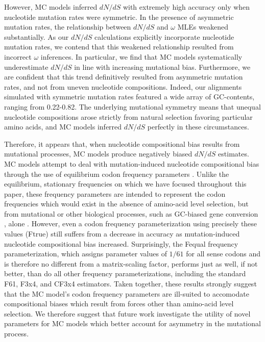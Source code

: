 \documentclass{pnastwo}
\begin{document}
\begin{article}
However, MC models inferred $dN/dS$ with extremely high accuracy only when nucleotide mutation rates were symmetric. In the presence of asymmetric mutation rates, the relationship between $dN/dS$ and $\omega$ MLEs weakened substantially. As our $dN/dS$ calculations explicitly incorporate nucleotide mutation rates, we contend that this weakened relationship resulted from incorrect $\omega$ inferences. In particular, we find that MC models systematically underestimate $dN/dS$ in line with increasing mutational bias. Furthermore, we are confident that this trend definitively resulted from asymmetric mutation rates, and not from uneven nucleotide compositions. Indeed, our alignments simulated with symmetric mutation rates featured a wide array of GC-contents, ranging from 0.22-0.82. The underlying mutational symmetry means that unequal nucleotide compositions arose strictly from natural selection favoring particular amino acids, and MC models inferred $dN/dS$ perfectly in these circumstances.
		
Therefore, it appears that, when nucleotide compositional bias results from mutational processes, MC models produce negatively biased $dN/dS$ estimates. MC models attempt to deal with mutation-induced nucleotide compositional bias through the use of equilibrium codon frequency parameters \cite{Yang2006}. Unlike the equilibrium, stationary frequencies on which we have focused throughout this paper, these frequency parameters are intended to represent the codon frequencies which would exist in the absence of amino-acid level selection, but from mutational or other biological processes, such as GC-biased gene conversion \cite{DuretGaltier2009,WebsterHurst2012}, alone \cite{GoldmanYang1994,MuseGaut1994,YN00,Yang2006}. However, even a codon frequency parameterization using precisely these values (Ftrue) still suffers from a decrease in accuracy as mutation-induced nucleotide compositional bias increased. Surprisingly, the Fequal frequency parameterization, which assigns parameter values of $1/61$ for all sense codons and is therefore no different from a matrix-scaling factor, performs just as well, if not better, than do all other frequency parameterizations, including the standard F61, F3x4, and CF3x4 estimators. Taken together, these results strongly suggest that the MC model's codon frequency parameters are ill-suited to accomodate compositional biases which result from forces other than amino-acid level selection. We therefore suggest that future work investigate the utility of novel parameters for MC models which better account for asymmetry in the mutational process.
		

\end{article}
\end{document}
